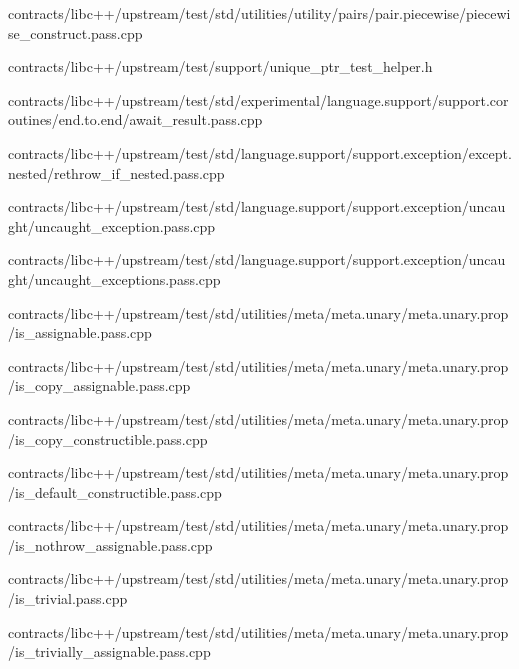\begin{DoxyCompactItemize}
contracts/libc++/upstream/test/std/utilities/utility/pairs/pair.\+piecewise/piecewise\+\_\+construct.\+pass.\+cpp\item 
contracts/libc++/upstream/test/support/unique\+\_\+ptr\+\_\+test\+\_\+helper.\+h\item 
contracts/libc++/upstream/test/std/experimental/language.\+support/support.\+coroutines/end.\+to.\+end/await\+\_\+result.\+pass.\+cpp\item 
contracts/libc++/upstream/test/std/language.\+support/support.\+exception/except.\+nested/rethrow\+\_\+if\+\_\+nested.\+pass.\+cpp\item 
contracts/libc++/upstream/test/std/language.\+support/support.\+exception/uncaught/uncaught\+\_\+exception.\+pass.\+cpp\item 
contracts/libc++/upstream/test/std/language.\+support/support.\+exception/uncaught/uncaught\+\_\+exceptions.\+pass.\+cpp\item 
contracts/libc++/upstream/test/std/utilities/meta/meta.\+unary/meta.\+unary.\+prop/is\+\_\+assignable.\+pass.\+cpp\item 
contracts/libc++/upstream/test/std/utilities/meta/meta.\+unary/meta.\+unary.\+prop/is\+\_\+copy\+\_\+assignable.\+pass.\+cpp\item 
contracts/libc++/upstream/test/std/utilities/meta/meta.\+unary/meta.\+unary.\+prop/is\+\_\+copy\+\_\+constructible.\+pass.\+cpp\item 
contracts/libc++/upstream/test/std/utilities/meta/meta.\+unary/meta.\+unary.\+prop/is\+\_\+default\+\_\+constructible.\+pass.\+cpp\item 
contracts/libc++/upstream/test/std/utilities/meta/meta.\+unary/meta.\+unary.\+prop/is\+\_\+nothrow\+\_\+assignable.\+pass.\+cpp\item 
contracts/libc++/upstream/test/std/utilities/meta/meta.\+unary/meta.\+unary.\+prop/is\+\_\+trivial.\+pass.\+cpp\item 
contracts/libc++/upstream/test/std/utilities/meta/meta.\+unary/meta.\+unary.\+prop/is\+\_\+trivially\+\_\+assignable.\+pass.\+cpp\end{DoxyCompactItemize}
